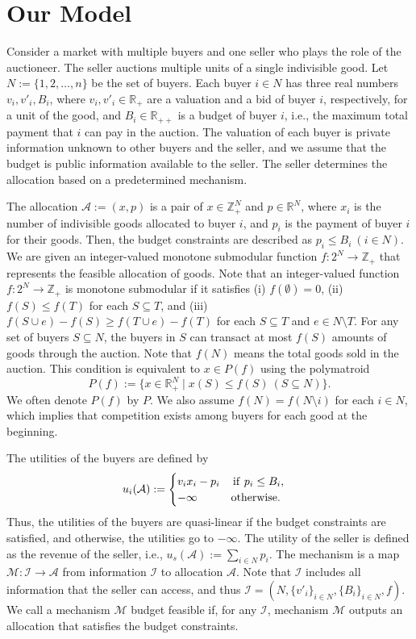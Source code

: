 \documentclass[letterpaper,11pt]{article}
\begin{document}
\section{Our Model}
Consider a market with multiple buyers and one seller who plays the role of the auctioneer. 
The seller auctions multiple units of a single indivisible good. 
Let $N:=\{1,2,\ldots,n\}$ be the set of buyers. 
Each buyer $i\in N$ has three real numbers $v_i, v'_i, B_i $, where   
$v_i, v'_i \in \mathbb R_+$ are a valuation and a bid of buyer $i$, respectively, for a unit of the good, 
and $B_i\in \mathbb R_{++}$ is a budget of buyer $i$, i.e., the maximum total payment that $i$ can pay in the auction.
The valuation of each buyer is private information unknown to other buyers and the seller, and we assume that the budget is public information available to the seller.
The seller determines the allocation based on a predetermined mechanism. 


The allocation $\mathcal A:=(x, p)$ is a pair of $x\in \mathbb Z^N_+$ and $p\in \mathbb R^N$, where $x_i$ is the number of indivisible goods allocated to buyer $i$, and $p_i$ is the payment of buyer $i$ for their goods. 
Then, the budget constraints are described as $p_i\leq B_i\ (i\in N)$.
We are given an integer-valued monotone submodular function $f: 2^N\to \mathbb Z_+$ 
that represents the feasible allocation of goods.
Note that an integer-valued function 
$f: 2^N\to \mathbb Z_+$ is monotone submodular if it satisfies 
(i) $f(\emptyset)=0$, (ii) $f(S)\leq f(T)$ for each $S\subseteq T$, and (iii) 
$f(S\cup e)-f(S)\geq f(T\cup e)-f(T)$ for each $S\subseteq T$ and $e\in N\setminus T$.
For any set of buyers $S\subseteq N$, the buyers in $S$ can transact at most $f(S)$ amounts of goods through the auction. Note that $f(N)$ means the total goods sold in the auction.
This condition is equivalent to $x\in P(f)$ using the polymatroid
\[
P(f):=\{x\in \mathbb R^N_{+}\mid x(S)\leq f(S)\ (S\subseteq N)\}.
\]
We often denote $P(f)$ by $P$.
We also assume $f(N)=f(N\setminus i)$ for each $i\in N$, 
which implies that competition exists among buyers for each good at the beginning.

The utilities of the buyers are defined by 
	\[
	u_i(\mathcal A):=
	\begin{cases}
	\displaystyle 
	v_i x_i-p_i\quad\,  {\rm if}\ p_i\leq B_i, \\
	-\infty \qquad\quad  {\rm otherwise}.
	\end{cases}
	\]
Thus, the utilities of the buyers are quasi-linear if the budget constraints are satisfied, 
and otherwise, the utilities go to $-\infty$.
The utility of the seller is defined as the revenue of the seller, i.e., $u_s(\mathcal A):=\sum_{i\in N}p_i$.
The mechanism is a map $\mathcal M: \mathcal I\to \mathcal A$ from information $\mathcal I$ to allocation $\mathcal A$. 
Note that $\mathcal I$ includes all information that the seller can access, 
and thus $\mathcal  I=(N, \{v'_i\}_{i\in N},\{B_i\}_{i\in N},f)$.
We call a mechanism $\mathcal M$ budget feasible if, for any $\mathcal I$, mechanism $\mathcal M$ 
outputs an allocation that satisfies the budget constraints.
\end{document}
